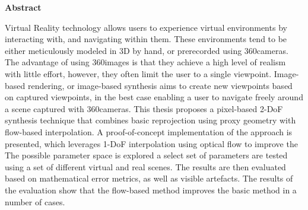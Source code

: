 \vspace*{2cm}

\begin{center}
    \textbf{Abstract}
\end{center}

\vspace*{1cm}

\noindent 
Virtual Reality technology allows users to experience virtual environments by interacting with, and navigating within them. These environments tend to be either meticulously modeled in 3D by hand, or prerecorded using 360\degree cameras. The advantage of using 360\degree images is that they achieve a high level of realism with little effort, however, they often limit the user to a single viewpoint.
Image-based rendering, or image-based synthesis aims to create new viewpoints based on captured viewpoints, in the best case enabling a user to navigate freely around a scene captured with 360\degree cameras.
This thesis proposes a pixel-based 2-DoF synthesis technique that combines basic reprojection using proxy geometry with flow-based interpolation.
A proof-of-concept implementation of the approach is presented, which leverages 1-DoF interpolation using optical flow to improve the 
The possible parameter space is explored a select set of parameters are
tested using a set of different virtual and real scenes.
The results are then evaluated based on mathematical error metrics, as well as visible artefacts. The results of the evaluation show that the flow-based method improves the basic method in a number of cases.


